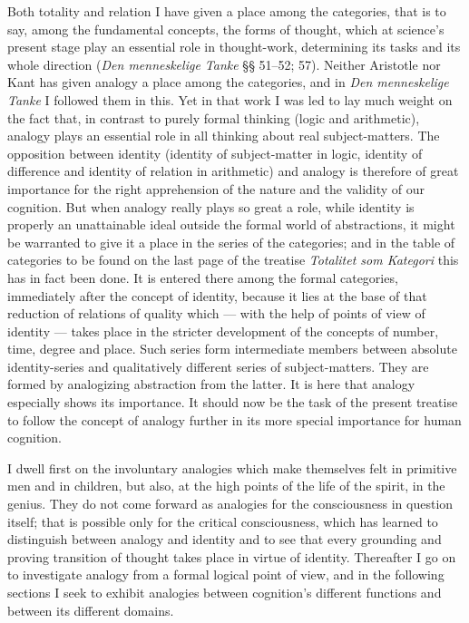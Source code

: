 \documentclass[12pt]{book}
\newcommand{\opage}[1]{\marginnote{\footnotesize\textit{[#1]}}}
\begin{document}
Both totality and relation I have given a place among the categories, that is
to say, among the fundamental concepts, the forms of thought, which at
science's present stage play an essential role in thought-work, determining its
tasks and its whole direction (\textit{Den menneskelige Tanke} §§ 51--52; 57).
Neither Aristotle nor Kant has given analogy a place among the categories, and
in \textit{Den menneskelige Tanke} I followed them in this. Yet in that work I
was led to lay much weight on the fact that, in contrast to purely formal
thinking (logic and arithmetic), analogy plays an essential role in all
thinking about real subject-matters. The opposition between identity (identity
of subject-matter in logic, identity of difference and identity of relation in
arithmetic) and analogy is therefore of great importance for the right
apprehension of the nature and the validity of our cognition. But when analogy
really plays so great a role, while identity is properly an unattainable ideal
outside the formal world of abstractions, it might be warranted to give it a
place in the series of the categories; and in the table of categories to be
found on the last page of the treatise \textit{Totalitet som Kategori} this has
in fact been done. It is entered there among the formal categories, immediately
after the concept of identity, because it lies at the \opage{5}base of that reduction of
relations of quality which --- with the help of points of view of identity ---
takes place in the stricter development of the concepts of number, time, degree
and place. Such series form intermediate members between absolute
identity-series and qualitatively different series of subject-matters. They are
formed by analogizing abstraction from the latter. It is here that analogy
especially shows its importance. It should now be the task of the present
treatise to follow the concept of analogy further in its more special
importance for human cognition.

I dwell first on the involuntary analogies which make themselves felt in
primitive men and in children, but also, at the high points of the life of the
spirit, in the genius. They do not come forward as analogies for the
consciousness in question itself; that is possible only for the critical
consciousness, which has learned to distinguish between analogy and identity
and to see that every grounding and proving transition of thought takes place
in virtue of identity. Thereafter I go on to investigate analogy from a formal
logical point of view, and in the following sections I seek to exhibit
analogies between cognition's different functions and between its different
domains.
\end{document}

